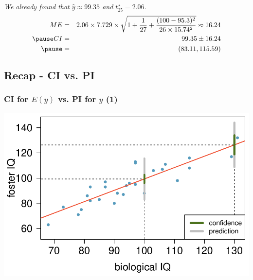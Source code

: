 \documentclass[slidestop,compress,mathserif,12pt,t,professionalfonts,xcolor=table]{beamer}
\newcommand{\soln}[1]{\textit{#1}}
\begin{document}

\begin{frame}[fragile]
\frametitle{}

\vfill


\vfill

\soln{
\pause
We already found that $\hat{y} \approx 99.35$ and $t_{25}^\star = 2.06$. 
\begin{eqnarray*}
ME &=& 2.06 \times 7.729 \times \sqrt{1 + \frac{1}{27} + \frac{(100 - 95.3)^2}{26 \times 15.74^2}} \approx 16.24 \\ \pause
CI &=& 99.35 \pm 16.24 \\ \pause
&=& (83.11, 115.59)
\end{eqnarray*}
}

\end{frame}


\subsection{Recap - CI vs. PI}


\begin{frame}
\frametitle{CI for $E(y)$ vs. PI for $y$ (1)}

\begin{center}
\includegraphics[width=\textwidth]{figures/twins/twins_IQ_100cintpint_130cintpint}
\end{center}

\end{frame}
\end{document}
